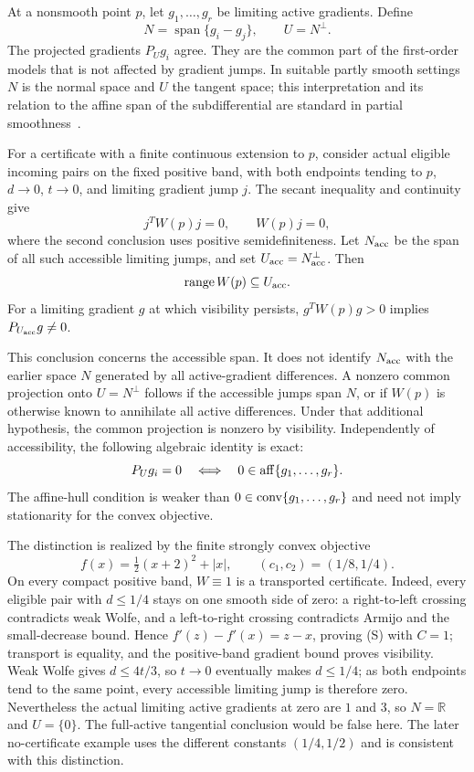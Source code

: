 At a nonsmooth point $p$, let $g_1,\dots,g_r$ be limiting active gradients. Define
\[
 N=\operatorname{span}\{g_i-g_j\},\qquad U=N^\perp.
\]
The projected gradients $P_Ug_i$ agree. They are the common part of the first-order models that is not affected by gradient jumps. In suitable partly smooth settings $N$ is the normal space and $U$ the tangent space; this interpretation and its relation to the affine span of the subdifferential are standard in partial smoothness~\cite{LL}.

For a certificate with a finite continuous extension to $p$, consider actual eligible incoming pairs on the fixed positive band, with both endpoints tending to $p$, $d\to0$, $t\to0$, and limiting gradient jump $j$. The secant inequality and continuity give
\[
 j^TW(p)j=0,\qquad W(p)j=0,
\]
where the second conclusion uses positive semidefiniteness. Let $N_{\rm acc}$ be the span of all such accessible limiting jumps, and set $U_{\rm acc}=N_{\rm acc}^{\perp}$. Then
\[
 \operatorname{range}W(p)\subseteq U_{\rm acc}.
\]
For a limiting gradient $g$ at which visibility persists, $g^TW(p)g>0$ implies $P_{U_{\rm acc}}g\ne0$.

This conclusion concerns the accessible span. It does not identify $N_{\rm acc}$ with the earlier space $N$ generated by all active-gradient differences. A nonzero common projection onto $U=N^\perp$ follows if the accessible jumps span $N$, or if $W(p)$ is otherwise known to annihilate all active differences. Under that additional hypothesis, the common projection is nonzero by visibility. Independently of accessibility, the following algebraic identity is exact:
\[
 P_Ug_i=0\quad\Longleftrightarrow\quad0\in\operatorname{aff}\{g_1,\dots,g_r\}.
\]
The affine-hull condition is weaker than $0\in\operatorname{conv}\{g_1,\dots,g_r\}$ and need not imply stationarity for the convex objective.

The distinction is realized by the finite strongly convex objective
\[
 f(x)=\tfrac12(x+2)^2+|x|,
 \qquad (c_1,c_2)=(1/8,1/4).
\]
On every compact positive band, $W\equiv1$ is a transported certificate. Indeed, every eligible pair with $d\le1/4$ stays on one smooth side of zero: a right-to-left crossing contradicts weak Wolfe, and a left-to-right crossing contradicts Armijo and the small-decrease bound. Hence $f'(z)-f'(x)=z-x$, proving (S) with $C=1$; transport is equality, and the positive-band gradient bound proves visibility. Weak Wolfe gives $d\le4t/3$, so $t\to0$ eventually makes $d\le1/4$; as both endpoints tend to the same point, every accessible limiting jump is therefore zero. Nevertheless the actual limiting active gradients at zero are $1$ and $3$, so $N=\mathbb R$ and $U=\{0\}$. The full-active tangential conclusion would be false here. The later no-certificate example uses the different constants $(1/4,1/2)$ and is consistent with this distinction.

